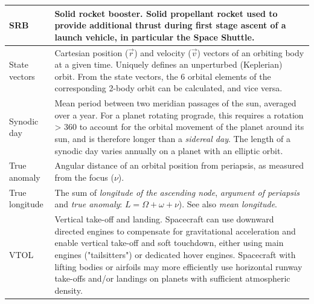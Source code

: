 \documentclass[Orbiter User Manual.tex]{subfiles}
\begin{document}
\begin{longtable}{ >{\RaggedRight}p{} p{} }
	\hline
	SRB & Solid rocket booster. Solid propellant rocket used to provide
		additional thrust during first stage ascent of a launch vehicle, in
		particular the Space Shuttle.\\
	\hline
	State vectors & Cartesian position ($\vec{r}$) and velocity ($\vec{v}$)
		vectors of an orbiting body at a given time. Uniquely defines an
		unperturbed (Keplerian) orbit. From the state vectors, the 6 orbital
		elements of the corresponding 2-body orbit can be calculated, and vice
		versa.\\
	\hline
	Synodic day & Mean period between two meridian passages of the sun, averaged
		over a year. For a planet rotating prograde, this requires a rotation >
		360\deg{} to account for the orbital movement of the planet around its
		sun, and is therefore longer than a \emph{sidereal day}. The length of a
		synodic day varies annually on a planet with an elliptic orbit.\\
	\hline
	True anomaly & Angular distance of an orbital position from periapsis, as
		measured from the focus ($\nu$).\\
	\hline
	True longitude & The sum of \emph{longitude of the ascending node},
		\emph{argument of periapsis} and \emph{true anomaly}:
		$L = \Omega + \omega + \nu$). See also \emph{mean longitude}.\\
	\hline
	VTOL & Vertical take-off and landing. Spacecraft can use downward directed
		engines to compensate for gravitational acceleration and enable vertical
		take-off and soft touchdown, either using main engines ("tailsitters")
		or dedicated hover engines. Spacecraft with lifting bodies or airfoils
		may more efficiently use horizontal runway take-offs and/or landings on
		planets with sufficient atmospheric density.\\
	\hline
	\end{longtable}
	\normalsize
\end{document}
